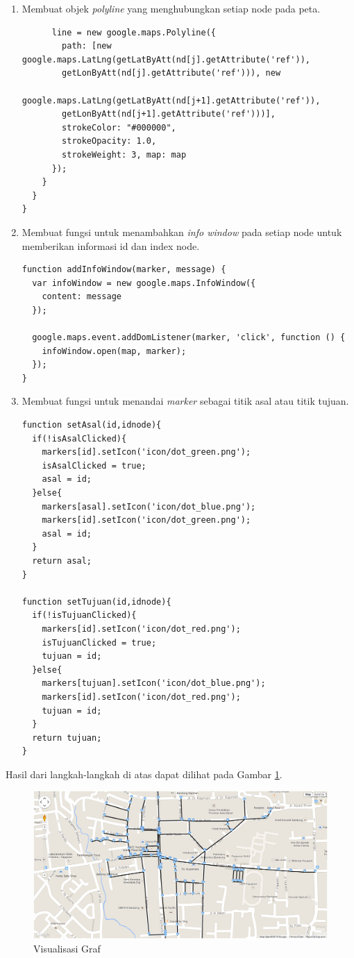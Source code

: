 \begin{enumerate}
  \item Membuat objek \textit{polyline} yang menghubungkan setiap node pada
  peta.

\begin{verbatim}
      line = new google.maps.Polyline({
        path: [new google.maps.LatLng(getLatByAtt(nd[j].getAttribute('ref')),
        getLonByAtt(nd[j].getAttribute('ref'))), new
        google.maps.LatLng(getLatByAtt(nd[j+1].getAttribute('ref')), 
        getLonByAtt(nd[j+1].getAttribute('ref')))], 
        strokeColor: "#000000",
        strokeOpacity: 1.0, 
        strokeWeight: 3, map: map
      });	
    }	
  }
}
\end{verbatim}
  
  \item Membuat fungsi untuk menambahkan \textit{info window} pada setiap node
  untuk memberikan informasi id dan index node.
\begin{verbatim}
function addInfoWindow(marker, message) {
  var infoWindow = new google.maps.InfoWindow({
    content: message
  });
  
  google.maps.event.addDomListener(marker, 'click', function () {
    infoWindow.open(map, marker);
  });
}
\end{verbatim}

  \item Membuat fungsi untuk menandai \textit{marker} sebagai titik asal atau
  titik tujuan.
\begin{verbatim}
function setAsal(id,idnode){
  if(!isAsalClicked){
    markers[id].setIcon('icon/dot_green.png');
    isAsalClicked = true;
    asal = id;
  }else{
    markers[asal].setIcon('icon/dot_blue.png');
    markers[id].setIcon('icon/dot_green.png');
    asal = id;
  }
  return asal;
}

function setTujuan(id,idnode){
  if(!isTujuanClicked){
    markers[id].setIcon('icon/dot_red.png');
    isTujuanClicked = true;
    tujuan = id;
  }else{
    markers[tujuan].setIcon('icon/dot_blue.png');
    markers[id].setIcon('icon/dot_red.png');
    tujuan = id;
  }
  return tujuan;
}
\end{verbatim}
\end{enumerate}
Hasil dari langkah-langkah di atas dapat dilihat pada Gambar
\ref{fig:visualisasi}.
\begin{figure}[h]
\centering
\includegraphics[scale=0.5]{Gambar/visualisasi_graf}
\caption[Visualisasi Graf]{Visualisasi Graf}
\label{fig:visualisasi}
\end{figure}

